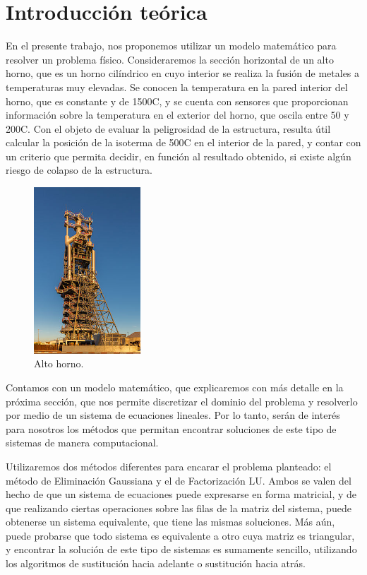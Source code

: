 \section{Introducción teórica}

  En el presente trabajo, nos proponemos utilizar un modelo matemático para resolver un problema físico. Consideraremos la sección horizontal de un alto horno, que es un horno cilíndrico en cuyo interior se realiza la fusión de metales a temperaturas muy elevadas. Se conocen la temperatura en la pared interior del horno, que es constante y de 1500{\degree}C, y se cuenta con sensores que proporcionan información sobre la temperatura en el exterior del horno, que oscila entre 50 y 200{\degree}C. Con el objeto de evaluar la peligrosidad de la estructura, resulta útil calcular la posición de la isoterma de 500{\degree}C en el interior de la pared, y contar con un criterio que permita decidir, en función al resultado obtenido, si existe algún riesgo de colapso de la estructura.

  \begin{figure}[h]
    \centering
    \includegraphics[width=4cm]{altoHorno.jpg}
    \caption{Alto horno.}
  \end{figure}

  Contamos con un modelo matemático, que explicaremos con más detalle en la próxima sección, que nos permite discretizar el dominio del problema y resolverlo por medio de un sistema de ecuaciones lineales. Por lo tanto, serán de interés para nosotros los métodos que permitan encontrar soluciones de este tipo de sistemas de manera computacional.

  Utilizaremos dos métodos diferentes para encarar el problema planteado: el método de Eliminación Gaussiana y el de Factorización LU. Ambos se valen del hecho de que un sistema de ecuaciones puede expresarse en forma matricial, y de que realizando ciertas operaciones sobre las filas de la matriz del sistema, puede obtenerse un sistema equivalente, que tiene las mismas soluciones. Más aún, puede probarse que todo sistema es equivalente a otro cuya matriz es triangular, y encontrar la solución de este tipo de sistemas es sumamente sencillo, utilizando los algoritmos de sustitución hacia adelante o sustitución hacia atrás.

